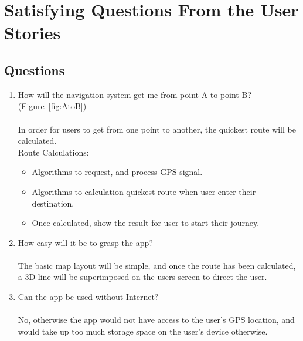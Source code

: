 \newpage

\section{Satisfying Questions From the User Stories}
\subsection*{Questions}
\begin{enumerate}
    \item How will the navigation system get me from point A to point B? (Figure~\ref{fig:AtoB})\\\\
    In order for users to get from one point to another, the quickest route will be calculated.\\
    Route Calculations:
    \begin{itemize}
        \item Algorithms to request, and process GPS signal.
        \item Algorithms to calculation quickest route when user enter their destination.
        \item Once calculated, show the result for user to start their journey.
    \end{itemize}
    
    \item How easy will it be to grasp the app?\\\\
    The basic map layout will be simple, and once the route has been calculated, a 3D line will be superimposed on the users screen to direct the user.
    
    \item Can the app be used without Internet? \\\\
    No, otherwise the app would not have access to the user's GPS location, and would take up too much storage space on the user's device otherwise.
\end{enumerate}